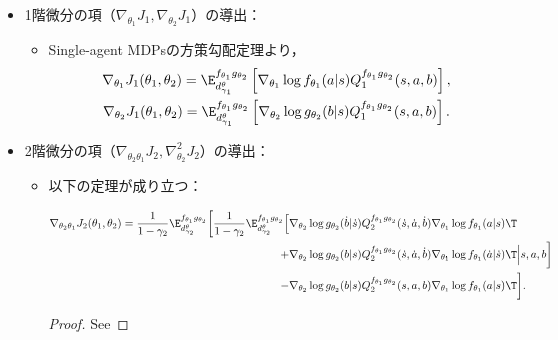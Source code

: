 \documentclass[a4paper,10pt,dvipdfmx]{jsarticle}
\begin{document}
\begin{itemize}
\begin{itemize}
    を評価できる．
    \item ただし，前セクションで紹介した$\tau$-Stackelberg updateは更新時に制約条件を考慮せず，現在の$(\theta_1,\theta_2)$でを評価するように更新する．その更新方法でも，DSEへの収束についていくつかの保証が与えられる．
    \end{itemize}
    \item 1階微分の項（$\nabla_{\theta_1}J_1, \nabla_{\theta_2}J_1$）の導出：
    \begin{itemize}
        \item Single-agent MDPsの方策勾配定理より，
        \begin{gather}
            \nabla_{\theta_1}J_1(\theta_1,\theta_2)=\E_{d_{\gamma_1}^{\theta}}^{f_{\theta_1}g_{\theta_2}}\left[\nabla_{\theta_1}\log f_{\theta_1}(a|s)Q_1^{f_{\theta_1}g_{\theta_2}}(s,a,b)\right],\\
            \nabla_{\theta_2}J_1(\theta_1,\theta_2)=\E_{d_{\gamma_1}^{\theta}}^{f_{\theta_1}g_{\theta_2}}\left[\nabla_{\theta_2}\log g_{\theta_2}(b|s)Q_1^{f_{\theta_1}g_{\theta_2}}(s,a,b)\right].
        \end{gather}
    \end{itemize}
    \item 2階微分の項（$\nabla_{\theta_2\theta_1}J_2, \nabla_{\theta_2}^2J_2$）の導出：
    \begin{itemize}
        \item 以下の定理が成り立つ：
        \begin{theorem}\label{thrm:SSPG_nabla_21_J_2}
            \begin{align}
                \nabla_{\theta_2\theta_1}J_2(\theta_1,\theta_2)
                =\dfrac{1}{1-\gamma_2}\E_{d_{\gamma_2}^{\theta}}^{f_{\theta_1}g_{\theta_2}}\bigg[\dfrac{1}{1-\gamma_2}\E_{d_{\gamma_2}^{\theta}}^{f_{\theta_1}g_{\theta_2}}\Big[&\nabla_{\theta_2}\log g_{\theta_2}(\dot{b}|\dot{s})Q_2^{f_{\theta_1}g_{\theta_2}}(\dot{s},\dot{a},\dot{b})\nabla_{\theta_1}\log f_{\theta_1}(a|s)\T\nonumber\\
                +&\nabla_{\theta_2}\log g_{\theta_2}(b|s)Q_2^{f_{\theta_1}g_{\theta_2}}(\dot{s},\dot{a},\dot{b})\nabla_{\theta_1}\log f_{\theta_1}(\dot{a}|\dot{s})\T\Big|s,a,b\bigg]\nonumber\\
                -&\nabla_{\theta_2}\log g_{\theta_2}(b|s)Q_2^{f_{\theta_1}g_{\theta_2}}(s,a,b)\nabla_{\theta_1}\log f_{\theta_1}(a|s)\T\bigg].
                    \end{align} 
            \end{theorem}
        \begin{proof}
            See 
        \end{proof}


\end{itemize}
\end{itemize}
\end{document}
